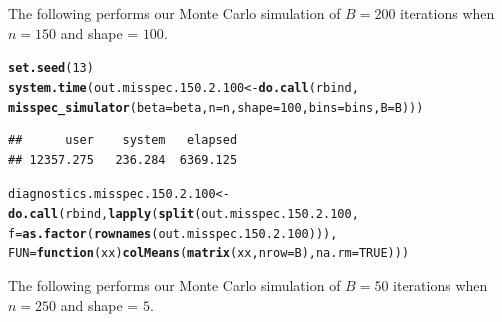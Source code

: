 \documentclass[11pt]{article}\usepackage[]{graphicx}\usepackage[]{color}
\makeatletter
\newcommand{\hlnum}[1]{\textcolor[rgb]{0.686,0.059,0.569}{#1}}%
\newcommand{\hlstd}[1]{\textcolor[rgb]{0.345,0.345,0.345}{#1}}%
\newcommand{\hlkwa}[1]{\textcolor[rgb]{0.161,0.373,0.58}{\textbf{#1}}}%
\newcommand{\hlkwb}[1]{\textcolor[rgb]{0.69,0.353,0.396}{#1}}%
\newcommand{\hlkwc}[1]{\textcolor[rgb]{0.333,0.667,0.333}{#1}}%
\newcommand{\hlkwd}[1]{\textcolor[rgb]{0.737,0.353,0.396}{\textbf{#1}}}%
\newenvironment{kframe}{%
 \def\at@end@of@kframe{}%
 \ifinner\ifhmode%
  \def\at@end@of@kframe{\end{minipage}}%
  \begin{minipage}{\columnwidth}%
 \fi\fi%
 \def\FrameCommand##1{\hskip\@totalleftmargin \hskip-\fboxsep
 \colorbox{shadecolor}{##1}\hskip-\fboxsep
     \hskip-\linewidth \hskip-\@totalleftmargin \hskip\columnwidth}%
 \MakeFramed {\advance\hsize-\width
   \@totalleftmargin\z@ \linewidth\hsize
   \@setminipage}}%
 {\par\unskip\endMakeFramed%
 \at@end@of@kframe}
\newenvironment{knitrout}{}{} %
\makeatother
\begin{document}
The following performs our Monte Carlo simulation of $B = 200$ iterations 
when $n = 150$ and shape = $100$.

\begin{knitrout}
\color{fgcolor}\begin{kframe}
\begin{alltt}
\hlkwd{set.seed}\hlstd{(}\hlnum{13}\hlstd{)}
\hlkwd{system.time}\hlstd{(out.misspec.150.2.100} \hlkwb{<-} \hlkwd{do.call}\hlstd{(rbind,}
  \hlkwd{misspec_simulator}\hlstd{(}\hlkwc{beta} \hlstd{= beta,} \hlkwc{n} \hlstd{= n,} \hlkwc{shape} \hlstd{=} \hlnum{100}\hlstd{,} \hlkwc{bins} \hlstd{= bins,} \hlkwc{B} \hlstd{= B)))}
\end{alltt}
\begin{verbatim}
##      user    system   elapsed 
## 12357.275   236.284  6369.125
\end{verbatim}
\begin{alltt}
\hlstd{diagnostics.misspec.150.2.100} \hlkwb{<-} \hlkwd{do.call}\hlstd{(rbind,} \hlkwd{lapply}\hlstd{(}\hlkwd{split}\hlstd{(out.misspec.150.2.100,}
  \hlkwc{f} \hlstd{=} \hlkwd{as.factor}\hlstd{(}\hlkwd{rownames}\hlstd{(out.misspec.150.2.100))),}
  \hlkwc{FUN} \hlstd{=} \hlkwa{function}\hlstd{(}\hlkwc{xx}\hlstd{)} \hlkwd{colMeans}\hlstd{(}\hlkwd{matrix}\hlstd{(xx,} \hlkwc{nrow} \hlstd{= B),} \hlkwc{na.rm} \hlstd{=} \hlnum{TRUE}\hlstd{)))}
\end{alltt}
\end{kframe}
\end{knitrout}






The following performs our Monte Carlo simulation of $B = 50$ iterations 
when $n = 250$ and shape = $5$. 
\end{document}
